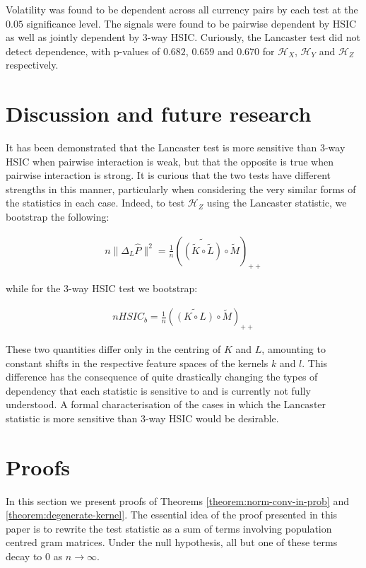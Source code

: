 \documentclass[]{article}
\begin{document}
Volatility was found to be dependent across all currency pairs by each test at the $0.05$ significance level. The signals were found to be pairwise dependent by HSIC as well as jointly dependent by 3-way HSIC. Curiously, the Lancaster test did not detect dependence, with p-values of $0.682$, $0.659$ and $0.670$ for $\mathcal{H}_X$, $\mathcal{H}_Y$ and $\mathcal{H}_Z$ respectively.


\section{Discussion and future research}

It has been demonstrated that the Lancaster test is more sensitive than 3-way HSIC when pairwise interaction is weak, but that the opposite is true when pairwise interaction is strong. It is curious that the two tests have different strengths in this manner, particularly when considering the very similar forms of the statistics in each case. Indeed, to test $\mathcal{H}_Z$ using the Lancaster statistic, we bootstrap the following:

\begin{align*}
n\|\Delta_L\hat{P}\|^2 = \frac{1}{n}\left(\widetilde{\left( \tilde{K} \circ \tilde{L}\right) }\circ \tilde{M} \right)_{++}
\end{align*}

while for the 3-way HSIC test we bootstrap:

\begin{align*}
nHSIC_b = \frac{1}{n}\left(\widetilde{\left( K \circ L\right) }\circ \tilde{M} \right)_{++}
\end{align*}

These two quantities differ only in the centring of $K$ and $L$, amounting to constant shifts in the respective feature spaces of the kernels $k$ and $l$. This difference has the consequence of quite drastically changing the types of dependency that each statistic is sensitive to and is currently not fully understood. A formal characterisation of the cases in which the Lancaster statistic is more sensitive than 3-way HSIC would be desirable.


\section{Proofs}

In this section we present proofs of Theorems \ref{theorem:norm-conv-in-prob} and \ref{theorem:degenerate-kernel}. The essential idea of the proof presented in this paper is to rewrite the test statistic as a sum of terms involving population centred gram matrices. Under the null hypothesis, all but one of these terms decay to $0$ as $n \longrightarrow \infty$. 
\end{document}
